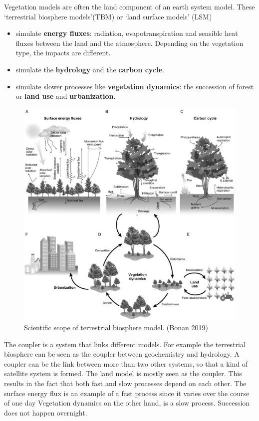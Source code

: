 \documentclass[
  12pt,
  oneside]{book}
\providecommand{\tightlist}{%
  \setlength{\itemsep}{0pt}\setlength{\parskip}{0pt}}
\begin{document}
Vegetation models are often the land component of an earth system model. These `terrestrial biosphere models'(TBM) or `land surface models' (LSM)

\begin{itemize}
\tightlist
\item
  simulate \textbf{energy fluxes}: radiation, evapotranspiration and sensible heat fluxes between the land and the atmosphere. Depending on the vegetation type, the impacts are different.
\item
  simulate the \textbf{hydrology} and the \textbf{carbon cycle}.
\item
  simulate slower processes like \textbf{vegetation dynamics}: the succession of forest or \textbf{land use} and \textbf{urbanization}.
\end{itemize}

\begin{figure}

{\centering \includegraphics[width=0.8\linewidth]{figures/chap1/cycles_bonan} 

}

\caption{Scientific scope of terrestrial biosphere model. (Bonan 2019)}\label{fig:f4}
\end{figure}

The coupler is a system that links different models. For example the terrestrial biosphere can be seen as the coupler between geochemistry and hydrology. A coupler can be the link between more than two other systems, so that a kind of satellite system is formed. The land model is mostly seen as the coupler. This results in the fact that both fast and slow processes depend on each other. The surface energy flux is an example of a fast process since it varies over the course of one day Vegetation dynamics on the other hand, is a slow process. Succession does not happen overnight.
\end{document}
